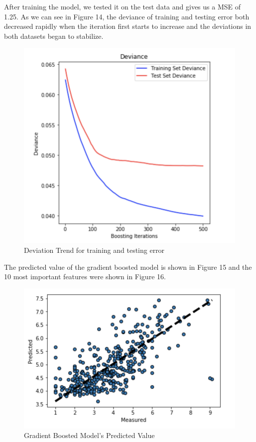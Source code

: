 \documentclass[letterpaper, 11 pt, conference]{ieeeconf}
\begin{document}
After training the model, we tested it on the test data and  gives us a MSE of 1.25. As we can see in Figure 14, the deviance of training and testing error both decreased rapidly when the iteration first starts to increase and the deviations in both datasets began to stabilize. 
\begin{figure}[h]
	\centering
    \includegraphics[scale = 0.6]{gradient_boosted_iterations}
    \caption{Deviation Trend for training and testing error}
\end{figure}
The predicted value of the gradient boosted model is shown in Figure 15 and the 10 most important features were shown in Figure 16. 
\begin{figure}[h]
	\centering
    \includegraphics[scale = 0.6]{gradient_boosted_result}
    \caption{Gradient Boosted Model's Predicted Value}
\end{figure}
\end{document}
